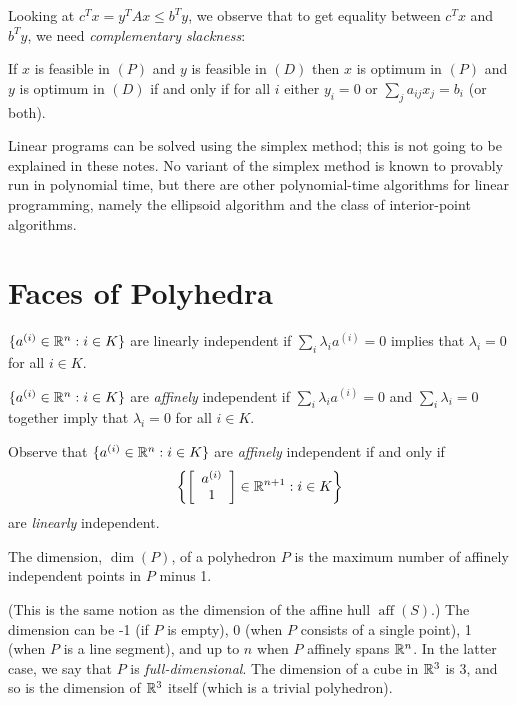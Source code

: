 \documentclass[12pt]{article}
\newcommand{\aff}{\operatorname{aff}}
\begin{document}
Looking at $c^Tx=y^TAx\leq b^Ty$, we observe that to get equality
between $c^Tx$ and $b^Ty$, we need {\it complementary slackness}:

\begin{theorem}
If $x$ is feasible in $(P)$ and $y$ is feasible in $(D)$ then $x$ is
optimum in $(P)$ and $y$ is optimum in $(D)$ if and only if for all
$i$ either $y_i=0$ or $\sum_j a_{ij} x_j =b_i$ (or both). 
\end{theorem}

Linear programs can be solved using the simplex method; this is not
going to be explained in these notes. No variant of the simplex method
is known to provably run in polynomial time, but there are other
polynomial-time algorithms for linear programming, namely the
ellipsoid algorithm and the class of interior-point algorithms. 

\section{Faces of Polyhedra}

\begin{definition}
$\{a^{(i)}\in {\mathbb R}^n: i\in K\}$ are linearly independent if $\sum_i \lambda_i
  a^{(i)}=0$ implies that $\lambda_i=0$ for all $i\in K$.
\end{definition} 

\begin{definition}
$\{a^{(i)}\in {\mathbb R}^n: i\in K\}$ are {\it affinely} independent if
  $\sum_i \lambda_i a^{(i)}=0$ and $\sum_i \lambda_i=0$ together imply
  that $\lambda_i=0$ for all $i\in K$.
\end{definition} 

Observe that $\{a^{(i)}\in {\mathbb R}^n: i\in K\}$ are {\it affinely}
independent  if and only if $$\left\{\left[\begin{array}{c} a^{(i)}\\
    1\end{array} \right]\in {\mathbb R}^{n+1}: i\in K\right\}$$ are {\it linearly}
independent.  

\begin{definition}
The dimension, $\dim(P)$,  of a polyhedron $P$ is the maximum number of affinely
independent points in $P$ minus 1. 
\end{definition}

(This is the same notion as the dimension of the affine hull $\aff(S)$.) The dimension can be -1 (if $P$ is empty), 0 (when $P$ consists of a
single point), 1 (when $P$ is a line segment), and up to $n$ when $P$
affinely spans ${\mathbb R}^n$. In the latter case, we say that $P$ is {\it
  full-dimensional}.  The dimension of a cube in ${\mathbb R}^3$ is 3, and so
is the dimension of ${\mathbb R}^3$ itself (which is a trivial polyhedron). 
\end{document}
